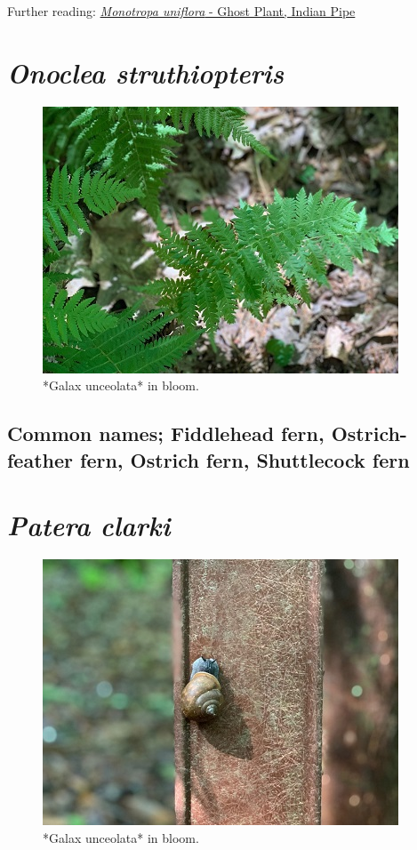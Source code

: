 \documentclass[
]{article}
\begin{document}
Further reading: \href{https://www.fs.fed.us/wildflowers/beauty/mycotrophic/monotropa_uniflora.shtml}{\emph{Monotropa uniflora} - Ghost Plant, Indian Pipe}

\hypertarget{onoclea-struthiopteris}{%
\section{\texorpdfstring{\emph{Onoclea struthiopteris}}{Onoclea struthiopteris}}\label{onoclea-struthiopteris}}

\begin{figure}

{\centering \includegraphics[width=0.5\linewidth]{fern} 

}

\caption{*Galax unceolata* in bloom.}\label{fig:shutfern}
\end{figure}

\hypertarget{common-names-fiddlehead-fern-ostrich-feather-fern-ostrich-fern-shuttlecock-fern}{%
\subsection{Common names; Fiddlehead fern, Ostrich-feather fern, Ostrich fern, Shuttlecock fern}\label{common-names-fiddlehead-fern-ostrich-feather-fern-ostrich-fern-shuttlecock-fern}}

\hypertarget{patera-clarki}{%
\section{\texorpdfstring{\emph{Patera clarki}}{Patera clarki}}\label{patera-clarki}}

\begin{figure}

{\centering \includegraphics[width=0.5\linewidth]{snail} 

}

\caption{*Galax unceolata* in bloom.}\label{fig:snaily}
\end{figure}
\end{document}
